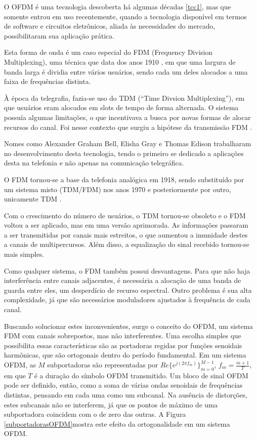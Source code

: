 \par O OFDM é uma tecnologia descoberta  há algumas décadas \ref{tcc1}, mas que somente entrou em uso recentemente, quando a tecnologia disponível em termos de software e circuitos eletrônicos, aliada às necessidades do mercado, possibilitaram sua aplicação prática.
\par Esta forma de onda é um caso especial do FDM (Frequency Division Multiplexing), uma técnica que data dos anos 1910 \cite{tcc1}, em que uma largura de banda larga é dividia entre vários usuários, sendo cada um deles alocados a uma faixa de frequências distinta. 
\par À época da telegrafia, fazia-se uso do TDM (“Time Divsion Multiplexing”), em que usuários eram alocados em slots de tempo de forma alternada. O sistema possuía algumas limitações, o que incentivava a busca por novas formas de alocar recursos do canal. Foi nesse contexto que surgiu a hipótese  da transmissão FDM \cite{tcc1}. 
\par Nomes como Alexander Graham Bell, Elisha Gray e Thomas Edison trabalharam no desenvolvimento desta tecnologia, tendo o primeiro se dedicado a aplicações desta na telefonia e não apenas na comunicação telegráfica.
\par O FDM tornou-se a base da telefonia analógica em 1918, sendo substituído por um sistema misto (TDM/FDM) nos anos 1970 e posteriormente por outro, unicamente TDM \cite{tcc1}.
\par Com o crescimento do número de usuários, o TDM tornou-se obsoleto e o FDM voltou a ser aplicado, mas em uma versão aprimorada. As informações passaram a ser transmitidas por canais mais estreitos, o que aumentou a imunidade destes a canais de multipercursos. Além disso, a equalização do sinal recebido tornou-se mais simples. 
\par Como qualquer sistema, o FDM também possui desvantagens. Para que não haja interferência entre canais adjacentes, é necessária a alocação de uma banda de guarda entre eles, um desperdício de recurso espectral. Outro problema é sua alta complexidade, já que são necessários moduladores ajustados à frequência de cada canal. 
\par Buscando solucionar estes inconvenientes, surge o conceito do OFDM, um sistema FDM com canais sobrepostos, mas não interferentes. Uma escolha simples que possibilita essas características são as portadoras regidas por funções senoidais harmônicas, que são ortogonais dentro do período fundamental. 		
Em um sistema OFDM, as $M$ subportadoras são representadas por $Re\{e^{j(2 \pi f_{m})}\}_{m = 0}^{M-1}$, $f_{m} = \frac{m+1}{T}$, em que $T$ é a duração do símbolo OFDM transmitido. Um bloco de sinal OFDM pode ser definido, então, como a soma de várias ondas senoidais de frequências distintas, pensando em cada uma como um subcanal. Na ausência de distorções, estes subcanais não se interferem, já que os pontos de máximo de uma subportadora coincidem com o de zero das outras. A Figura \ref{subportadorasOFDM}mostra este efeito da ortogonalidade em um sistema OFDM.

